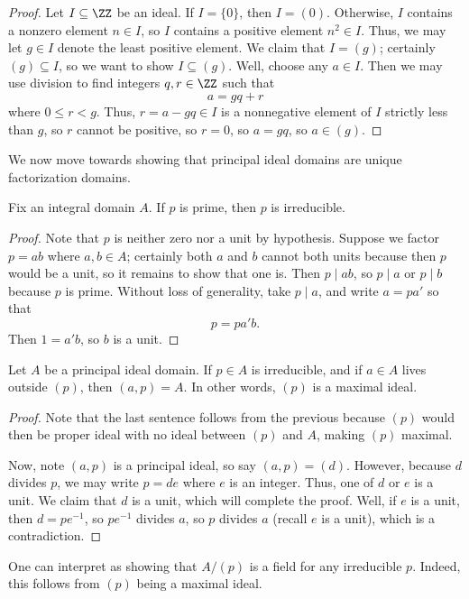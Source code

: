 \documentclass[../notes.tex]{subfiles}
\begin{document}
\begin{proof}
	Let $I\subseteq\ZZ$ be an ideal. If $I=\{0\}$, then $I=(0)$. Otherwise, $I$ contains a nonzero element $n\in I$, so $I$ contains a positive element $n^2\in I$. Thus, we may let $g\in I$ denote the least positive element. We claim that $I=(g)$; certainly $(g)\subseteq I$, so we want to show $I\subseteq(g)$. Well, choose any $a\in I$. Then we may use division to find integers $q,r\in\ZZ$ such that
	\[a=gq+r\]
	where $0\le r<g$. Thus, $r=a-gq\in I$ is a nonnegative element of $I$ strictly less than $g$, so $r$ cannot be positive, so $r=0$, so $a=gq$, so $a\in(g)$.
\end{proof}
We now move towards showing that principal ideal domains are unique factorization domains.
\begin{lemma} \label{lem:prime-is-irred}
	Fix an integral domain $A$. If $p$ is prime, then $p$ is irreducible.
\end{lemma}
\begin{proof}
	Note that $p$ is neither zero nor a unit by hypothesis. Suppose we factor $p=ab$ where $a,b\in A$; certainly both $a$ and $b$ cannot both units because then $p$ would be a unit, so it remains to show that one is. Then $p\mid ab$, so $p\mid a$ or $p\mid b$ because $p$ is prime. Without loss of generality, take $p\mid a$, and write $a=pa'$ so that
	\[p=pa'b.\]
	Then $1=a'b$, so $b$ is a unit.
\end{proof}
\begin{lemma} \label{lem:bezout-for-pid}
	Let $A$ be a principal ideal domain. If $p\in A$ is irreducible, and if $a\in A$ lives outside $(p)$, then $(a,p)=A$. In other words, $(p)$ is a maximal ideal.
\end{lemma}
\begin{proof}
	Note that the last sentence follows from the previous because $(p)$ would then be proper ideal with no ideal between $(p)$ and $A$, making $(p)$ maximal.

	Now, note $(a,p)$ is a principal ideal, so say $(a,p)=(d)$. However, because $d$ divides $p$, we may write $p=de$ where $e$ is an integer. Thus, one of $d$ or $e$ is a unit. We claim that $d$ is a unit, which will complete the proof. Well, if $e$ is a unit, then $d=pe^{-1}$, so $pe^{-1}$ divides $a$, so $p$ divides $a$ (recall $e$ is a unit), which is a contradiction.
\end{proof}
\begin{remark} \label{rem:pid-is-dim-1}
	One can interpret  as showing that $A/(p)$ is a field for any irreducible $p$. Indeed, this follows from $(p)$ being a maximal ideal.
\end{remark}
\end{document}
